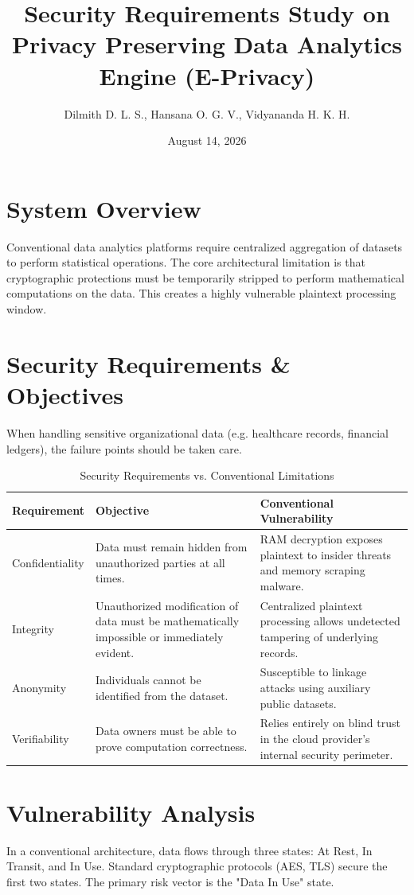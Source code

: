 \documentclass[12pt]{article}
\title{Security Requirements Study on Privacy Preserving Data Analytics Engine (E-Privacy)}
\author{Dilmith D. L. S., Hansana O. G. V., Vidyananda H. K. H.}
\date{August 14, 2026}
\begin{document}
\maketitle

\section{System Overview}
Conventional data analytics platforms require centralized aggregation of datasets to perform statistical operations. The core architectural limitation is that cryptographic protections must be temporarily stripped to perform mathematical computations on the data. This creates a highly vulnerable plaintext processing window.

\section{Security Requirements \& Objectives}
When handling sensitive organizational data (e.g. healthcare records, financial ledgers), the failure points should be taken care.

\begin{table}[H]
\centering
\begin{tabularx}{\textwidth}{l X X}
\toprule
\textbf{Requirement} & \textbf{Objective} & \textbf{Conventional Vulnerability} \\
\midrule
Confidentiality & Data must remain hidden from unauthorized parties at all times. & RAM decryption exposes plaintext to insider threats and memory scraping malware. \\
Integrity & Unauthorized modification of data must be mathematically impossible or immediately evident. & Centralized plaintext processing allows undetected tampering of underlying records. \\
Anonymity & Individuals cannot be identified from the dataset. & Susceptible to linkage attacks using auxiliary public datasets. \\
Verifiability & Data owners must be able to prove computation correctness. & Relies entirely on blind trust in the cloud provider's internal security perimeter. \\
\bottomrule
\end{tabularx}
\caption{Security Requirements vs. Conventional Limitations}
\label{tab:security_reqs}
\end{table}

\section{Vulnerability Analysis}
In a conventional architecture, data flows through three states: At Rest, In Transit, and In Use. Standard cryptographic protocols (AES, TLS) secure the first two states. The primary risk vector is the "Data In Use" state.
\end{document}
